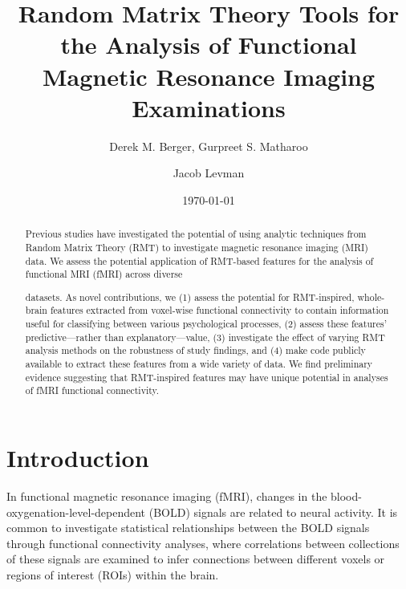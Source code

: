\documentclass[NETN,manuscript]{stjour-new}
\begin{document}
\title{Random Matrix Theory Tools for the Analysis of Functional Magnetic Resonance Imaging Examinations}
\author[Derek M. Berger, Gurpreet S. Matharoo, Jacob Levman]{
    Derek M. Berger,
    Gurpreet S. Matharoo
    \and Jacob Levman
}

\date{\today}



\begin{abstract}
    Previous studies have investigated the potential of using analytic techniques from Random Matrix
    Theory (RMT) to investigate magnetic resonance imaging (MRI) data. We assess the potential
    application of RMT-based features for the analysis of functional MRI (fMRI) across diverse

    datasets. As novel contributions, we (1) assess the potential for RMT-inspired, whole-brain
    features extracted from voxel-wise functional connectivity to contain information useful for
    classifying between various psychological processes, (2) assess these features’
    predictive—rather than explanatory—value, (3) investigate the effect of varying RMT analysis
    methods on the robustness of study findings, and (4) make code publicly available to extract
    these features from a wide variety of data. We find preliminary evidence suggesting that
    RMT-inspired features may have unique potential in analyses of fMRI functional connectivity.
\end{abstract}


\section{Introduction}

In functional magnetic resonance imaging (fMRI), changes in the blood-oxygenation-level-dependent
(BOLD) signals are related to neural activity. It is common to investigate statistical relationships
between the BOLD signals through functional connectivity analyses, where correlations between
collections of these signals are examined to infer connections between different voxels or regions
of interest (ROIs) within the brain.
\end{document}
